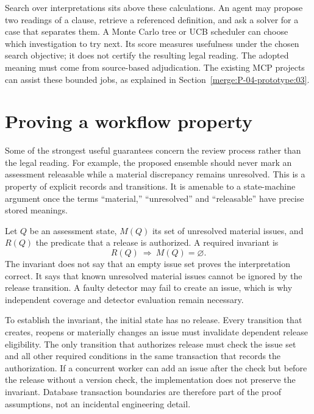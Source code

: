 Search over interpretations sits above these calculations. An agent may propose
two readings of a clause, retrieve a referenced definition, and ask a solver for
a case that separates them. A Monte Carlo tree or UCB scheduler can choose which
investigation to try next. Its score measures usefulness under the chosen search
objective; it does not certify the resulting legal reading. The adopted meaning
must come from source-based adjudication. The existing MCP projects can assist
these bounded jobs, as explained in Section~\ref{merge:P-04-prototype:03}.

\section{Proving a workflow property}
\label{merge:M03:10}

\label{sec:proof-workflow}
Some of the strongest useful guarantees concern the review process rather than
the legal reading. For example, the proposed ensemble should never mark an
assessment releasable while a material discrepancy remains unresolved. This is
a property of explicit records and transitions. It is amenable to a state-machine
argument once the terms ``material,'' ``unresolved'' and ``releasable'' have
precise stored meanings.

Let $Q$ be an assessment state, $M(Q)$ its set of unresolved material issues,
and $R(Q)$ the predicate that a release is authorized. A required invariant is
\begin{equation}
 R(Q)\ \Longrightarrow\ M(Q)=\varnothing.
 \label{eq:no-open-release}
\end{equation}
The invariant does not say that an empty issue set proves the interpretation
correct. It says that known unresolved material issues cannot be ignored by
the release transition. A faulty detector may fail to create an issue, which
is why independent coverage and detector evaluation remain necessary.


To establish the invariant, the initial state has no release. Every transition
that creates, reopens or materially changes an issue must invalidate dependent
release eligibility. The only transition that authorizes release must check
the issue set and all other required conditions in the same transaction that
records the authorization. If a concurrent worker can add an issue after the
check but before the release without a version check, the implementation does
not preserve the invariant. Database transaction boundaries are therefore part
of the proof assumptions, not an incidental engineering detail.

